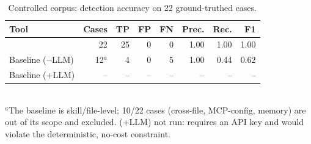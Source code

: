 \begin{table}[t]\centering\caption{Controlled corpus: detection accuracy on 22 ground-truthed cases.}\label{tab:controlled}
\begin{tabular}{lrrrrrrr}\toprule
Tool & Cases & TP & FP & FN & Prec. & Rec. & F1 \\\midrule
\sysname{} & 22 & 25 & 0 & 0 & 1.00 & 1.00 & 1.00 \\
Baseline ($\neg$LLM) & 12$^{a}$ & 4 & 0 & 5 & 1.00 & 0.44 & 0.62 \\
Baseline (+LLM) & -- & -- & -- & -- & -- & -- & -- \\
\bottomrule\end{tabular}
\\[2pt]\footnotesize $^{a}$The baseline is skill/file-level; 10/22 cases (cross-file, MCP-config, memory) are out of its scope and excluded. (+LLM) not run: requires an API key and would violate the deterministic, no-cost constraint.
\end{table}
